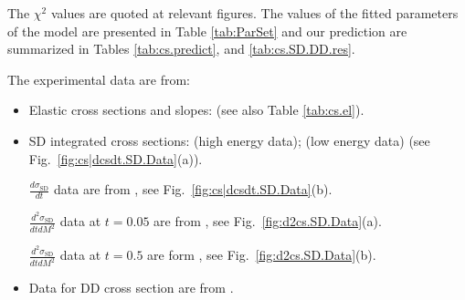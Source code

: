 \documentclass[12pt]{article}
\begin{document}
The $\chi^2$ values are quoted at relevant figures.  
The values of the fitted parameters of the model are presented in Table \ref{tab:ParSet} and
our prediction  are summarized in Tables \ref{tab:cs.predict}, and \ref{tab:cs.SD.DD.res}.

The experimental data are from:
\begin{itemize}
 \item Elastic cross sections and slopes: \cite{[T1].TOTEM, [T2].TOTEM, [tmp3]Amos.E710.[3], [tmp3]Amos.E710.[5], Abe.CDF.1993, [tmp6].Ansorge.UA5, Bozzo1} (see also Table \ref{tab:cs.el}).
 
 \item SD integrated cross sections: \cite{Poghosyan for ALICE, [tmp6].Ansorge.UA5, Bernard.UA4.1987, Amos.E710.1992, Abe.CDF.1993} (high energy data); \cite{lowSD.Cool, lowSD.Schamberger, lowSD.Albrow, lowSD.Armitage} (low energy data) (see Fig.~\ref{fig:cs|dcsdt.SD.Data}(a)).
 
 $\frac{d\sigma_\mathrm{SD}}{dt}$ data are from \cite{Bernard.UA4.1987},
 see Fig.~\ref{fig:cs|dcsdt.SD.Data}(b).
 
 $\frac{d^2\sigma_\mathrm{SD}}{dtdM^2}$ data at $t=0.05$ are 
 from \cite{Abe.CDF.1993, GoulianosMomtanha}, see Fig.~\ref{fig:d2cs.SD.Data}(a).
 
 $\frac{d^2\sigma_\mathrm{SD}}{dtdM^2}$ data at $t=0.5$ 
 are form \cite{Bozzo.SD_t0.55}, see Fig.~\ref{fig:d2cs.SD.Data}(b).
 
 \item Data for DD cross section are from \cite{Poghosyan for ALICE, Affolder.DD, [tmp6].Ansorge.UA5}.
\end{itemize}




\end{document}
